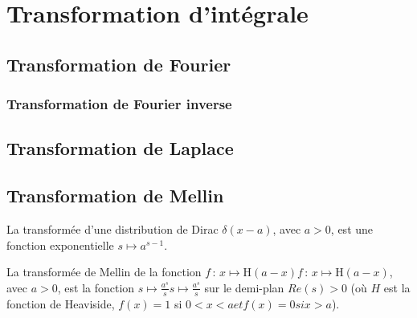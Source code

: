 \chapter{Transformation d'intégrale}
 \section{Transformation de Fourier}
 \begin{exercise}
 \end{exercise}
 \begin{exercise}
 \end{exercise}
 \begin{exercise}
 \end{exercise}
  \subsection{Transformation de Fourier inverse}
  \begin{exercise}
 \end{exercise}
 \begin{exercise}
 \end{exercise}
 \section{Transformation de Laplace}
 \begin{python}
 \end{python}
 \begin{exercise}
 \end{exercise}
 \section{Transformation de Mellin}
 \begin{example}
  La transformée d'une distribution de Dirac ${\displaystyle \delta (x-a)}$, avec $a > 0$, est une fonction exponentielle ${\displaystyle s\mapsto a^{s-1}}$.
 \end{example}
 \begin{python}
 \end{python}
 \begin{example}
  La transformée de Mellin de la fonction ${\displaystyle f\,:\,x\mapsto \mathrm {H} (a-x)} {\displaystyle f\,:\,x\mapsto \mathrm {H} (a-x)}$, avec $a > 0$, est la fonction ${\displaystyle s\mapsto {\frac {a^{s}}{s}}} {\displaystyle s\mapsto {\frac {a^{s}}{s}}}$ sur le demi-plan $Re (s) > 0$
(où $H$ est la fonction de Heaviside, $f(x) = 1$ si $0 < x < a et f (x) = 0 si x > a$).
 \end{example}
 \begin{python}
 \end{python}
 \begin{example}
 \end{example}
 \begin{python}
 \end{python}

